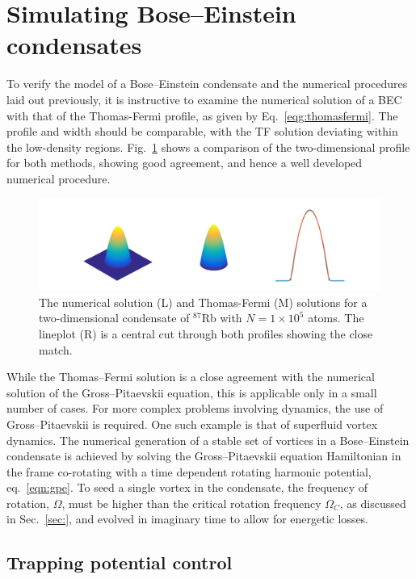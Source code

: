 \section{Simulating Bose--Einstein condensates}
To verify the model of a Bose--Einstein condensate and the numerical procedures laid out previously, it is instructive to examine the numerical solution of a BEC with that of the Thomas-Fermi profile, as given by Eq.~\ref{eqg:thomasfermi}. The profile and width should be comparable, with the TF solution deviating within the low-density regions. Fig.~\ref{fig:gpe_tf_3} shows a comparison of the two-dimensional profile for both methods, showing good agreement, and hence a well developed numerical procedure.
\begin{figure}\centering
    \includegraphics[width=\textwidth,trim=20ex 0ex 20ex 10ex]{Images/ch4_vtx/gpe_tf_3.pdf}
    \caption{The numerical solution (L) and Thomas-Fermi (M) solutions for a two-dimensional condensate of $^{87}$Rb with $N=1\times 10^5$ atoms. The lineplot (R) is a central cut through both profiles showing the close match.}\label{fig:gpe_tf_3}
\end{figure}

While the Thomas--Fermi solution is a close agreement with the numerical solution of the Gross--Pitaevskii equation, this is applicable only in a small number of cases. For more complex problems involving dynamics, the use of Gross--Pitaevskii is required. One such example is that of superfluid vortex dynamics. The numerical generation of a stable set of vortices in a Bose--Einstein condensate is achieved by solving the Gross--Pitaevskii equation Hamiltonian in the frame co-rotating with a time dependent rotating harmonic potential, eq.~\ref{eqn:gpe}. To seed a single vortex in the condensate, the frequency of rotation, $\Omega$, must be higher than the critical rotation frequency $\Omega_C$, as discussed in Sec.~\ref{sec:}, and evolved in imaginary time to allow for energetic losses.



\subsection{Trapping potential control}


